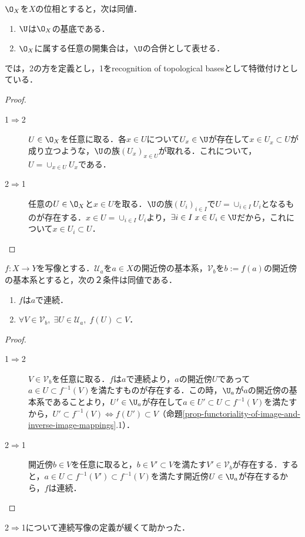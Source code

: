 \documentclass[uplatex,dvipdfmx]{jsreport}
\begin{document}
\begin{lemma}\label{lemma-characterization-of-basis}
    $\O_X$を$X$の位相とすると，次は同値．
    \begin{enumerate}
        \item $\U$は$\O_X$の基底である．
        \item $\O_X$に属する任意の開集合は，$\U$の合併として表せる．
    \end{enumerate}
    \cite{nLab}では，2の方を定義とし，1をrecognition of topological basesとして特徴付けとしている．
\end{lemma}
\begin{proof}\mbox{}
    \begin{description}
        \item[1$\Rightarrow$2] 
        $U\in\O_X$を任意に取る．各$x\in U$について$U_x\in\U$が存在して$x\in U_x\subset U$が成り立つような，$\U$の族$(U_x)_{x\in U}$が取れる．これについて，$U=\cup_{x\in U}U_x$である．
        \item[2$\Rightarrow$1] 
        任意の$U\in\O_X$と$x\in U$を取る．$\U$の族$(U_i)_{i\in I}$で$U=\cup_{i\in I}U_i$となるものが存在する．$x\in U=\cup_{i\in I}U_i$より，$\exists i\in I\;x\in U_i\in\U$だから，これについて$x\in U_i\subset U$．
    \end{description}
\end{proof}

\begin{proposition}\label{prop-continuousness-in-terms-of-basis}
    $f:X\to Y$を写像とする．$\mathcal{U}_a$を$a\in X$の開近傍の基本系，$\mathcal{V}_b$を$b:=f(a)$の開近傍の基本系とすると，次の２条件は同値である．
    \begin{enumerate}
        \item $f$は$a$で連続．
        \item $\forall V\in\mathcal{V}_b,\;\exists U\in\mathcal{U}_a,\;f(U)\subset V$．
    \end{enumerate}
\end{proposition}
\begin{proof}\mbox{}
    \begin{description}
        \item[1$\Rightarrow$2] 
        $V\in\mathcal{V}_b$を任意に取る．$f$は$a$で連続より，$a$の開近傍$U$であって$a\in U\subset f^{-1}(V)$を満たすものが存在する．この時，$\U_a$が$a$の開近傍の基本系であることより，$U'\in \U_a$が存在して$a\in U'\subset U\subset f^{-1}(V)$を満たすから，$U'\subset f^{-1}(V)\Leftrightarrow f(U')\subset V$（命題\ref{prop-functoriality-of-image-and-inverse-image-mappings}.1）．
        \item[2$\Rightarrow$1] 
        開近傍$b\in V$を任意に取ると，$b\in V'\subset V$を満たす$V'\in\mathcal{V}_b$が存在する．すると，$a\in U\subset f^{-1}(V')\subset f^{-1}(V)$を満たす開近傍$U\in\U_a$が存在するから，$f$は連続．
    \end{description}
\end{proof}
\begin{remark}
    2$\Rightarrow$1について連続写像の定義が緩くて助かった．
\end{remark}
\end{document}
